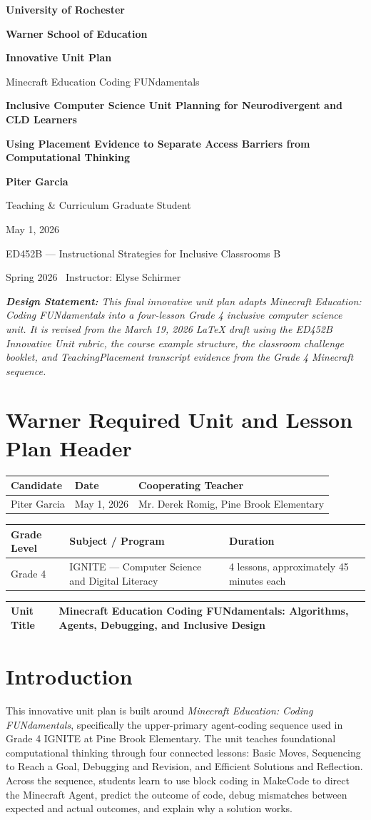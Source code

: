 \documentclass[12pt]{article}
\renewcommand{\maketitle}{%
\begin{titlepage}
\thispagestyle{empty}
\centering
\vspace*{0.65in}
{\Large\bfseries University of Rochester\par}
{\large\bfseries Warner School of Education\par}
\vspace{0.8in}
{\LARGE\bfseries\color{navyBlue}Innovative Unit Plan\par}
{\Large Minecraft Education Coding FUNdamentals\par}
\vspace{0.35in}
{\large\textcolor{navyBlue}{\textbf{Inclusive Computer Science Unit Planning for Neurodivergent and CLD Learners}}\par}
{\large\textcolor{brickRed}{\textbf{Using Placement Evidence to Separate Access Barriers from Computational Thinking}}\par}
\vspace{0.8in}
{\large\textbf{Piter Garcia}\par}
{\large Teaching \& Curriculum Graduate Student\par}
\vspace{0.15in}
{\large May 1, 2026\par}
\vfill
{\large ED452B --- Instructional Strategies for Inclusive Classrooms B\par}
{\normalsize Spring 2026 \textperiodcentered\ Instructor: Elyse Schirmer\par}
\noindent\textit{\tiny\textbf{Design Statement:} This final innovative unit plan adapts Minecraft Education: Coding FUNdamentals into a four-lesson Grade 4 inclusive computer science unit. It is revised from the March 19, 2026 LaTeX draft using the ED452B Innovative Unit rubric, the course example structure, the classroom challenge booklet, and TeachingPlacement transcript evidence from the Grade 4 Minecraft sequence.}
\end{titlepage}}
\begin{document}
\hypersetup{pageanchor=false}
\maketitle
\clearpage
\hypersetup{pageanchor=true}
\tableofcontents
\clearpage

\section{Warner Required Unit and Lesson Plan Header}
\begin{tabularx}{\textwidth}{|P{2.2in}|P{1.6in}|L|}
\hline
{}\color{white}\bfseries Candidate & \color{white}\bfseries Date & \color{white}\bfseries Cooperating Teacher \\
\hline
Piter Garcia & May 1, 2026 & Mr. Derek Romig, Pine Brook Elementary \\
\hline
\end{tabularx}

\vspace{4pt}
\begin{tabularx}{\textwidth}{|P{1.8in}|P{2.5in}|L|}
\hline
{}\color{white}\bfseries Grade Level & \color{white}\bfseries Subject / Program & \color{white}\bfseries Duration \\
\hline
Grade 4 & IGNITE --- Computer Science and Digital Literacy & 4 lessons, approximately 45 minutes each \\
\hline
\end{tabularx}

\vspace{4pt}
\begin{tabularx}{\textwidth}{|P{1.8in}|L|}
\hline
{}\color{white}\bfseries Unit Title & Minecraft Education Coding FUNdamentals: Algorithms, Agents, Debugging, and Inclusive Design \\
\hline
\end{tabularx}

\section{Introduction}
This innovative unit plan is built around \emph{Minecraft Education: Coding FUNdamentals}, specifically the upper-primary agent-coding sequence used in Grade 4 IGNITE at Pine Brook Elementary. The unit teaches foundational computational thinking through four connected lessons: Basic Moves, Sequencing to Reach a Goal, Debugging and Revision, and Efficient Solutions and Reflection. Across the sequence, students learn to use block coding in MakeCode to direct the Minecraft Agent, predict the outcome of code, debug mismatches between expected and actual outcomes, and explain why a solution works.
\end{document}
